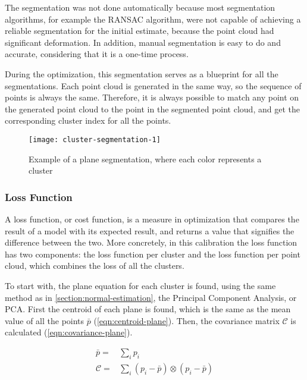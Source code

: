 The segmentation was not done automatically because most segmentation algorithms, for example the RANSAC algorithm, were not capable of achieving a reliable segmentation for the initial estimate, because the point cloud had significant deformation. In addition, manual segmentation is easy to do and accurate, considering that it is a one-time process.

During the optimization, this segmentation serves as a blueprint for all the segmentations. Each point cloud is generated in the same way, so the sequence of points is always the same. Therefore, it is always possible to match any point on the generated point cloud to the point in the segmented point cloud, and get the corresponding cluster index for all the points.

\begin{figure}[h]
    \centering
    \texttt{[image: cluster-segmentation-1]}
    \caption{Example of a plane segmentation, where each color represents a cluster}
    \label{figure:cluster-segmentation-1}
\end{figure}

\subsubsection{Loss Function}

A loss function, or cost function, is a measure in optimization that compares the result of a model with its expected result, and returns a value that signifies the difference between the two. More concretely, in this calibration the loss function has two components: the loss function per cluster and the loss function per point cloud, which combines the loss of all the clusters. 

To start with, the plane equation for each cluster is found, using the same method as in \cref{section:normal-estimation}, the Principal Component Analysis, or PCA. First the centroid of each plane is found, which is the same as the mean value of all the points $\bar{p}$ (\cref{eqn:centroid-plane}). Then, the covariance matrix $\mathcal{C}$ is calculated (\cref{eqn:covariance-plane}).

\begin{align}
    \bar{p} = & \sum_{i}{p_i}
        \label{eqn:centroid-plane} \\
    \mathcal{C} = & \sum_{i}{(p_i - \bar{p}) \otimes (p_i - \bar{p})}
        \label{eqn:covariance-plane}
\end{align}

